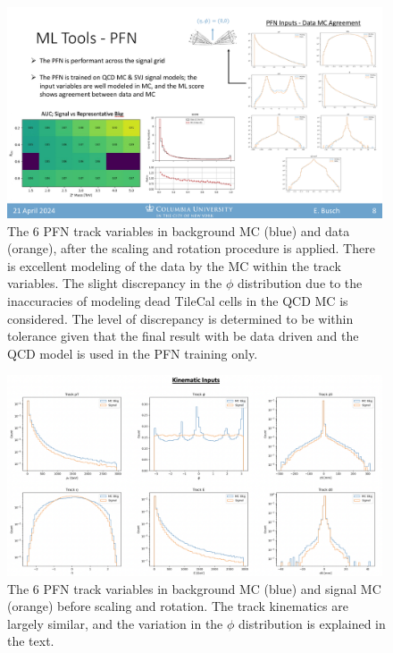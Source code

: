 \begin{figure}[!htbp]
   \centering
   \includegraphics[width=0.99\textwidth]{figures/ml/pfn_datamc_input}
    \caption{The 6 PFN track variables in background MC (blue) and data (orange), after the scaling and rotation procedure is applied. There is excellent modeling of the data by the MC within the track variables. The slight discrepancy in the $\phi$ distribution due to the inaccuracies of modeling dead TileCal cells in the QCD MC is considered. The level of discrepancy is determined to be within tolerance given that the final result with be data driven and the QCD model is used in the PFN training only.
    \label{fig:pfn_datamc_input}}
\end{figure}

\begin{figure}[!htbp]
    \centering
     \includegraphics[width=0.99\textwidth]{figures/ml/pfn_bkgsig_input_kin}
     \caption{The 6 PFN track variables in background MC (blue) and signal MC (orange) before scaling and rotation. The track kinematics are largely similar, and the variation in the $\phi$ distribution is explained in the text.}
      \label{fig:pfn_bkgsig_input_kin}
\end{figure}

